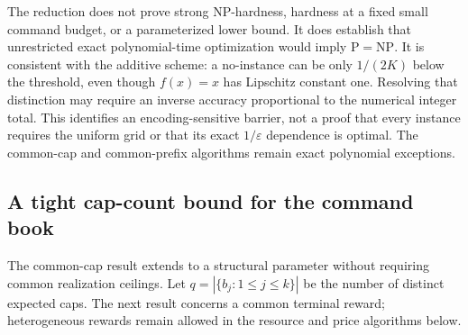 \documentclass[11pt,letterpaper]{article}
\theoremstyle{definition}\newtheorem{remark}[theorem]{Remark}
\begin{document}
The reduction does not prove strong NP-hardness, hardness at a fixed small command budget, or a parameterized lower bound. It does establish that unrestricted exact polynomial-time optimization would imply $\mathrm P=\mathrm{NP}$. It is consistent with the additive scheme: a no-instance can be only $1/(2K)$ below the threshold, even though $f(x)=x$ has Lipschitz constant one. Resolving that distinction may require an inverse accuracy proportional to the numerical integer total. This identifies an encoding-sensitive barrier, not a proof that every instance requires the uniform grid or that its exact $1/\varepsilon$ dependence is optimal. The common-cap and common-prefix algorithms remain exact polynomial exceptions.
\subsection{A tight cap-count bound for the command book}\label{sec:smallmenus56}
The common-cap result extends to a structural parameter without requiring common realization ceilings. Let $q=|\{b_j:1\leq j\leq k\}|$ be the number of distinct expected caps. The next result concerns a common terminal reward; heterogeneous rewards remain allowed in the resource and price algorithms below.
\end{document}
